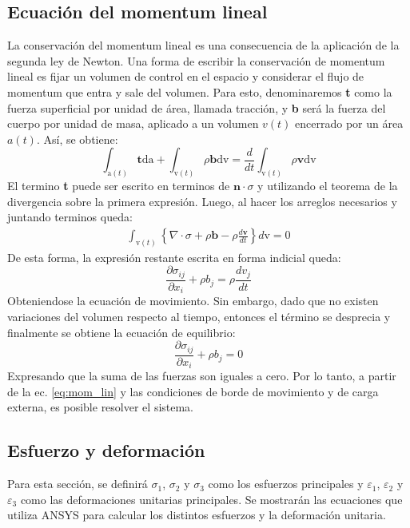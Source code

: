 \newpage

\subsection{Ecuación del momentum lineal}

La conservación del momentum lineal es una consecuencia de la aplicación de la segunda ley de Newton. Una forma de escribir la conservación de momentum lineal es fijar un volumen de control en el espacio y considerar el flujo de momentum que entra y sale del volumen. Para esto, denominaremos \textbf{t} como la fuerza superficial por unidad de área, llamada tracción, y \textbf{b} será la fuerza del cuerpo por unidad de masa, aplicado a un volumen $v(t)$ encerrado por un área $a(t)$. Así, se obtiene:
\begin{equation}
	\int_{\text{a}(t)} \mathbf{t} \text{da} + \int_{\text{v}(t)} \rho \mathbf{b} \text{dv} = \frac{d}{dt} \int_{\text{v}(t)} \rho \mathbf{v} \text{dv}
\end{equation}
El termino \textbf{t} puede ser escrito en terminos de $\mathbf{n}\cdot \sigma$ y utilizando el teorema de la divergencia sobre la primera expresión. Luego, al hacer los arreglos necesarios y juntando terminos queda:
\begin{gather*}
	\int_{\text{v}(t)} \left\lbrace \nabla \cdot \sigma + \rho\mathbf{b} - \rho \frac{d\mathbf{v}}{dt}\right\rbrace d\text{v} = 0
\end{gather*}
De esta forma, la expresión restante escrita en forma indicial queda:
\begin{equation}
	\frac{\partial \sigma_{ij}}{\partial x_i} + \rho b_j = \rho \frac{dv_j}{dt}
\end{equation}
Obteniendose la ecuación de movimiento. Sin embargo, dado que no existen variaciones del volumen respecto al tiempo, entonces el término se desprecia y finalmente se obtiene la ecuación de equilibrio:
\begin{equation}\label{eq:mom_lin}
	\frac{\partial \sigma_{ij}}{\partial x_i} + \rho b_j = 0
\end{equation}
Expresando que la suma de las fuerzas son iguales a cero. Por lo tanto, a partir de la ec. \ref{eq:mom_lin} y las condiciones de borde de movimiento y de carga externa, es posible resolver el sistema.

\subsection{Esfuerzo y deformación}
Para esta sección, se definirá $\sigma_1$, $\sigma_2$ y $\sigma_3$ como los esfuerzos principales y $\varepsilon_1$, $\varepsilon_2$ y $\varepsilon_3$ como las deformaciones unitarias principales. Se mostrarán las ecuaciones que utiliza ANSYS para calcular los distintos esfuerzos y la deformación unitaria.
